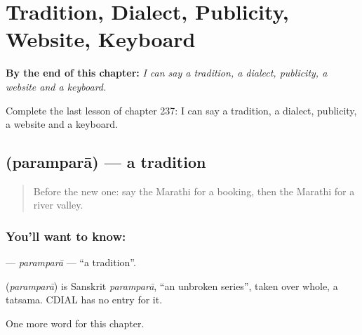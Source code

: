 
\chapter{Tradition, Dialect, Publicity, Website, Keyboard}
\label{ch:mr-tradition-dialect-publicity-website-keyboard}

\begin{chapteropening}
\textbf{By the end of this chapter:} \emph{I can say a tradition, a dialect, publicity, a website and a keyboard.}

Complete the last lesson of chapter 237: I can say a tradition, a dialect, publicity, a website and a keyboard.
\end{chapteropening}

\section[\texorpdfstring{\mr{परंपरा} (paramparā)}{परंपरा (paramparā)}]{ (paramparā) — a tradition}

\label{lesson:MR-C237-parampara}



\begin{quote}
Before the new one: say the Marathi for a booking, then the Marathi for a river valley.
\end{quote}

\subsection*{You'll want to know: }
\textbf{} — \emph{paramparā} — \textquotedblleft{}a tradition\textquotedblright{}.

\begin{cousinweb}
\textbf{} (\emph{paramparā}) is Sanskrit \emph{paramparā}, \textquotedblleft{}an unbroken series\textquotedblright{}, taken over whole, a tatsama. CDIAL has no entry for it.
\end{cousinweb}

\begin{grammarlens}[title={What you've built}]
One more word for this chapter.
\end{grammarlens}

